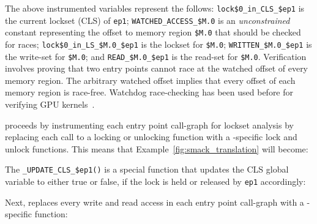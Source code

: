 {The above instrumented variables represent the follows: \texttt{lock\$0\_in\_CLS\_\$ep1} is the current lockset (CLS) of \texttt{ep1}; \texttt{WATCHED\_ACCESS\_\$M.0} is an \emph{unconstrained} constant representing the offset to memory region \texttt{\$M.0} that should be checked for races; \texttt{lock\$0\_in\_LS\_\$M.0\_\$ep1} is the lockset for \texttt{\$M.0}; \texttt{WRITTEN\_\$M.0\_\$ep1} is the write-set for \texttt{\$M.0}; and \texttt{READ\_\$M.0\_\$ep1} is the read-set for \texttt{\$M.0}. Verification involves proving that two entry points cannot race at the watched offset of every memory region. The arbitrary watched offset implies that every offset of each memory region is race-free. Watchdog race-checking has been used before for verifying GPU kernels~\cite{bardsley2014engineering}.

\whoop proceeds by instrumenting each entry point call-graph for lockset analysis by replacing each call to a locking or unlocking function with a \whoop-specific lock and unlock functions. This means that Example~\ref{fig:smack_translation} will become:


The \texttt{\_UPDATE\_CLS\_\$ep1()} is a special function that updates the CLS global variable to either true or false, if the lock is held or released by \texttt{ep1} accordingly:


Next, \whoop replaces every write and read access in each entry point call-graph with a \whoop-specific function:

}
